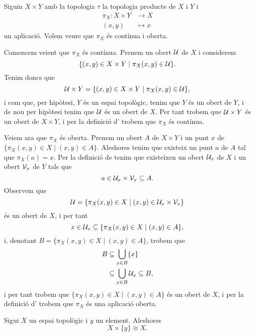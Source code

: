 \documentclass[../Apunts.tex]{subfiles}
\begin{document}
	\begin{example}[Projeccions]
		\label{ex:les projeccions en la topologia producte són contínues i obertes}
		Siguin \(X\times Y\) amb la topologia \(\tau\) la topologia producte de \(X\) i \(Y\) i
		\begin{align*}
			\pi_{X}\colon X\times Y&\longrightarrow X \\
			(x,y)&\longmapsto x
		\end{align*}
		un aplicació. Volem veure que \(\pi_{X}\) és contínua i oberta.
		\begin{solution}
			Comencem veient que \(\pi_{X}\) és contínua. Prenem un obert \(\mathcal{U}\) de \(X\) i considerem
			\[\{(x,y)\in X\times Y\mid \pi_{X}(x,y)\in\mathcal{U}\}.\]
			Tenim doncs que
			\[\mathcal{U}\times Y=\{(x,y)\in X\times Y\mid \pi_{X}(x,y)\in\mathcal{U}\},\]
			i com que, per hipòtesi, \(Y\) és un espai topològic, tenim que \(Y\) és un obert de \(Y\), i de nou per hipòtesi tenim que \(\mathcal{U}\) és un obert de \(X\). Per tant trobem que \(\mathcal{U}\times Y\) és un obert de \(X\times Y\), i per la definició d' trobem que \(\pi_{X}\) és contínua.
			
			Veiem ara que \(\pi_{X}\) és oberta. Prenem un obert \(A\) de \(X\times Y\) i un punt \(x\) de \(\{\pi_{X}(x,y)\in X\mid(x,y)\in A\}\). Aleshores tenim que existeix un punt \(a\) de \(A\) tal que \(\pi_{X}(a)=x\). Per la definició de  tenim que existeixen un obert \(\mathcal{U}_{x}\) de \(X\) i un obert \(\mathcal{V}_{x}\) de \(Y\) tals que
			\[a\in\mathcal{U}_{x}\times\mathcal{V}_{x}\subseteq A.\]
			Observem que
			\[\mathcal{U}=\{\pi_{X}(x,y)\in X\mid(x,y)\in\mathcal{U}_{x}\times\mathcal{V}_{x}\}\]
			és un obert de \(X\), i per tant
			\[x\in\mathcal{U}_{x}\subseteq\{\pi_{X}(x,y)\in X\mid(x,y)\in A\},\]
			i, denotant \(B=\{\pi_{X}(x,y)\in X\mid(x,y)\in A\}\), trobem que
			\begin{align*}
				B&\subseteq\bigcup_{x\in B}\{x\} \\
				&\subseteq\bigcup_{x\in B}\mathcal{U}_{x}\subseteq B,
			\end{align*}
			i per tant trobem que \(\{\pi_{X}(x,y)\in X\mid(x,y)\in A\}\) és un obert de \(X\), i per la definició d' trobem que \(\pi_{X}\) és una aplicació oberta. %
		\end{solution}
	\end{example}
	\begin{corollary} %
		\label{cor:un espai topològic producte amb un element és homeomorf a l'espai topològic}
		Sigui \(X\) un espai topològic i \(y\) un element. Aleshores
		\[X\times\{y\}\cong X.\]
	\end{corollary}
\end{document}
